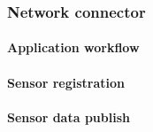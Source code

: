 \subsubsection{Network connector}


\paragraph{Application workflow}







\paragraph{Sensor registration}


\paragraph{Sensor data publish}















